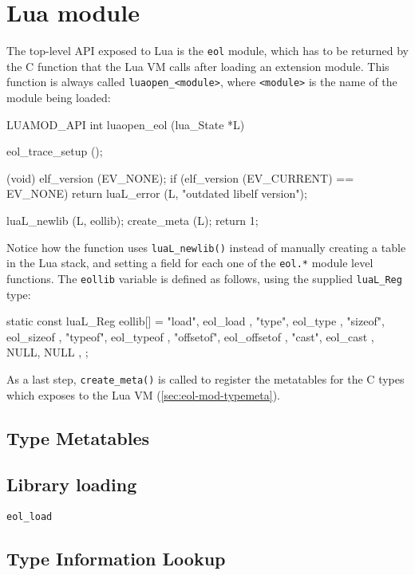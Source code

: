 \section{\Eol* Lua module}

The top-level API exposed to Lua is the \verb|eol| module, which has to be
returned by the C function that the Lua VM calls after loading an extension
module. This function is always called \verb|luaopen_<module>|, where
\verb|<module>| is the name of the module being loaded:

\begin{ccode}
LUAMOD_API int
luaopen_eol (lua_State *L)
{
  eol_trace_setup ();

  (void) elf_version (EV_NONE);
  if (elf_version (EV_CURRENT) == EV_NONE)
    return luaL_error (L, "outdated libelf version");

  luaL_newlib (L, eollib);
  create_meta (L);
  return 1;
}
\end{ccode}

Notice how the function uses \verb|luaL_newlib()| instead of manually creating
a table in the Lua stack, and setting a field for each one of the \verb|eol.*|
module level functions. The \verb|eollib| variable is defined as follows,
using the supplied \verb|luaL_Reg| type:

\begin{ccode}
static const luaL_Reg eollib[] = {
  { "load",     eol_load     },
  { "type",     eol_type     },
  { "sizeof",   eol_sizeof   },
  { "typeof",   eol_typeof   },
  { "offsetof", eol_offsetof },
  { "cast",     eol_cast     },
  { NULL, NULL },
};
\end{ccode}

As a last step, \verb|create_meta()| is called to register the metatables for
the C types which \Eol* exposes to the Lua VM (\vref{sec:eol-mod-typemeta}).

\subsection{Type Metatables}
  \label{sec:eol-mod-typemeta}

\subsection{Library loading}

  \verb|eol_load| 

\subsection{Type Information Lookup}


